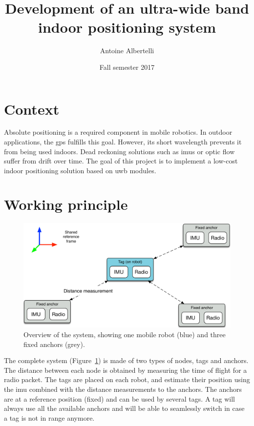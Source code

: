 \documentclass[a4paper,twocolumn]{article}
\date{Fall semester 2017}
\title{Development of an ultra-wide band indoor positioning system}
\author{Antoine Albertelli}
\begin{document}
\maketitle
{}

\section{Context}

Absolute positioning is a required component in mobile robotics.
In outdoor applications, the \gls{gps} fulfills this goal.
However, its short wavelength prevents it from being used indoors.
Dead reckoning solutions such as \glspl{imu} or optic flow suffer from drift over time.
The goal of this project is to implement a low-cost indoor positioning solution based on \gls{uwb} modules.

\section{Working principle}

\begin{figure}[h!]
    \centering
    \includegraphics[width=\textwidth]{figures/system.pdf}
    \caption{Overview of the system, showing one mobile robot (blue) and three fixed anchors (grey).}
    \label{fig:system}
\end{figure}

The complete system (Figure~\ref{fig:system}) is made of two types of nodes, tags and anchors.
The distance between each node is obtained by measuring the time of flight for a radio packet.
The tags are placed on each robot, and estimate their position using the \gls{imu} combined with the distance measurements to the anchors.
The anchors are at a reference position (fixed) and can be used by several tags.
A tag will always use all the available anchors and will be able to seamlessly switch in case a tag is not in range anymore.
\end{document}

